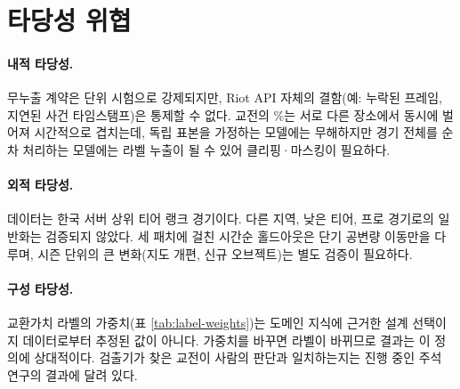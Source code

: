 
\section{타당성 위협}
\label{sec:disc-threats}

\paragraph{내적 타당성.} 무누출 계약은 단위 시험으로 강제되지만, Riot API 자체의 결함(예: 누락된 프레임, 지연된 사건 타임스탬프)은 통제할 수 없다. 교전의 \overlapPct{}\%는 서로 다른 장소에서 동시에 벌어져 시간적으로 겹치는데, 독립 표본을 가정하는 모델에는 무해하지만 경기 전체를 순차 처리하는 모델에는 라벨 누출이 될 수 있어 클리핑·마스킹이 필요하다.

\paragraph{외적 타당성.} 데이터는 한국 서버 상위 티어 랭크 경기이다. 다른 지역, 낮은 티어, 프로 경기로의 일반화는 검증되지 않았다. 세 패치에 걸친 시간순 홀드아웃은 단기 공변량 이동만을 다루며, 시즌 단위의 큰 변화(지도 개편, 신규 오브젝트)는 별도 검증이 필요하다.

\paragraph{구성 타당성.} 교환가치 라벨의 가중치(표 \ref{tab:label-weights})는 도메인 지식에 근거한 설계 선택이지 데이터로부터 추정된 값이 아니다. 가중치를 바꾸면 라벨이 바뀌므로 결과는 이 정의에 상대적이다. 검출기가 찾은 교전이 사람의 판단과 일치하는지는 진행 중인 주석 연구의 결과에 달려 있다.
